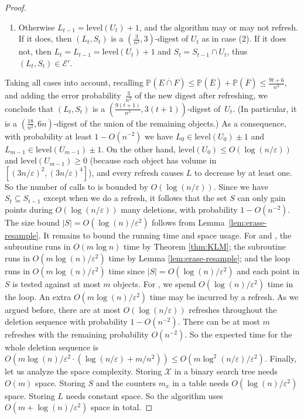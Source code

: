 \documentclass[11pt]{article}
\def\set#1{\left\{ #1 \right\}}
\newcommand{\level}{\mathrm{level}}
\newcommand{\eps}{\varepsilon}
\renewcommand{\Pr}{\mathbb{P}}
\newcommand{\class}[1]{\mathcal{#1}}
\begin{document}
\begin{proof}
\begin{enumerate}[label={(\arabic*)}]
\[            \leq \frac{24 \log n}{\eps^2}.
        \]
        So the algorithm refreshes. During refresh, the algorithm computes $L' \in \level(U_t) \pm 1$ with probability at least $1 - \tfrac 1{n^3}$ by Theorem~\ref{thm:KLM}, and then we have $L_t = \min \set{L_{t-1}-1, L'} = L' \in \level(U_t) \pm 1$. Hence, it returns a $(\frac{3}{n^3}, 3)$-digest $(L_t, S_t)$ of $U_t$ by Lemma~\ref{lem:erase-resample}.
%
        \item Otherwise $L_{t-1} = \level(U_t) + 1$, and the algorithm may or may not refresh. If it does, then $(L_t,S_t)$ is a $(\frac{3}{n^3}, 3)$-digest of $U_t$ as in case (2). If it does not, then $L_t = L_{t-1} = \level(U_t) + 1$ and $S_t = S_{t-1} \cap U_t$, thus $(L_t, S_t) \in \class{E}'$.
    \end{enumerate}
    Taking all cases into account, recalling $\Pr(\overline{E \cap F}) \leq \Pr(\overline{E}) + \Pr(\overline{F}) \leq \frac{9t+6}{n^3}$, and adding the error probability~$\tfrac{3}{n^3}$ of the new digest after refreshing, we conclude that $(L_t, S_t)$ is a $(\frac{9(t+1)}{n^3}, 3(t+1))$-digest of~$U_t$. (In particular, it is a $(\frac{18}{n^2}, 6n)$-digest of the union of the remaining objects.)
%
    As a consequence, with probability at least $1 - O(n^{-2})$ we have $L_0 \in \level(U_0) \pm 1$ and $L_{m-1} \in \level(U_{m-1}) \pm 1$. On the other hand, $\level(U_0) \leq O(\log(n/\eps))$ and $\level(U_{m-1}) \geq 0$ (because each object has volume in $[(3n/\eps)^2, (3n/\eps)^4]$), and every refresh causes $L$ to decrease by at least one. So the number of calls to  is bounded by $O(\log(n/\eps))$. Since we have $S_t \subseteq S_{t-1}$ except when we do a refresh, it follows that the set $S$ can only gain points during $O(\log(n/\eps))$ many deletions, with probability $1 - O(n^{-2})$.
%
    The size bound $|S| = O(\log(n)/\eps^2)$ follows from Lemma~\ref{lem:erase-resample}.
%
    It remains to bound the running time and space usage.
    For \initialize and , the subroutine \KLM runs in $O(m \log n)$ time by Theorem \ref{thm:KLM}; the subroutine \resample runs in $O(m \log (n) / \eps^2)$ time by Lemma \ref{lem:erase-resample}; and the loop runs in $O(m \log(n) / \eps^2)$ time since $|S| = O(\log(n)/\eps^2)$ and each point in $S$ is tested against at most $m$ objects.
%
    For \del, we spend $O(\log (n) / \eps^2)$ time in the loop. An extra $O(m \log (n) / \eps^2)$ time may be incurred by a refresh. As we argued before, there are at most $O(\log(n/\eps))$ refreshes throughout the deletion sequence with probability $1 - O(n^{-2})$. There can be at most $m$ refreshes with the remaining probability $O(n^{-2})$. So the expected time for the whole deletion sequence is $O(m \log(n) / \eps^2 \cdot (\log(n/\eps) + m/n^2)) \leq O(m \log^2(n/\eps)/\eps^2)$.
%
    Finally, let us analyze the space complexity. Storing $\class{X}$ in a binary search tree needs $O(m)$ space. Storing $S$ and the counters $m_x$ in a table needs $O(\log(n)/\eps^2)$ space. Storing $L$ needs constant space. So the algorithm uses $O(m + \log(n)/\eps^2)$ space in total.
\end{proof}
%
\end{document}
